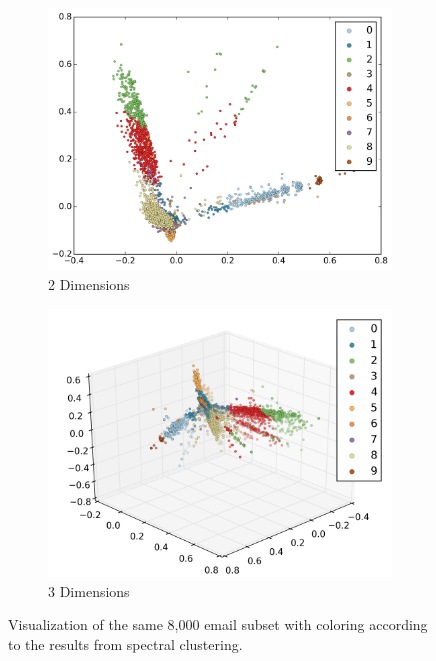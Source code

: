 \documentclass[12pt]{article}
\theoremstyle{definition}
\theoremstyle{algodesc}
\begin{document}
\begin{figure}[htbp] \centering
  \begin{subfigure}[t]{.7\linewidth}
    \includegraphics[width=\linewidth]{../images/mds_2d_cluster.png}
    \caption{2 Dimensions} \label{fig:cluster:2d}
  \end{subfigure}
  \begin{subfigure}[t]{.7\linewidth}
    \includegraphics[width=\linewidth]{../images/mds_3d_cluster_1.png}
    \caption{3 Dimensions} \label{fig:cluster:3d}
  \end{subfigure}
  \caption{Visualization of the same 8,000 email subset with coloring according to the results from spectral clustering.}
  \label{fig:cluster}
\end{figure}
\end{document}
